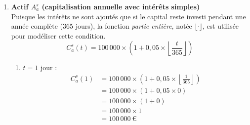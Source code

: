 \documentclass{article}
\begin{document}
\begin{enumerate}[label=\textbf{R1.\arabic*}]
\begin{enumerate}[label=(\alph*)]
              \item $t = 30\ \text{ans} = 10\,950\ \text{jours}$~: 
                    \begin{align*}
                        C_q^s(10\,950) & = 100\,000 \times \left(1 + \frac{0,05}{365} \times 10\,950\right) \\
                                       & = 100\,000 \times (1 + 1,5)                                        \\
                                       & = 100\,000 \times 2,5                                              \\
                                       & = \boxed{250\,000,00\ \text{€}}                                  
                    \end{align*}
                            
          \end{enumerate}
          
    \item \textbf{Actif \( A_a^s \) (capitalisation annuelle avec intérêts simples)} \\
          Puisque les intérêts ne sont ajoutés que si le capital reste investi pendant une année complète (365 jours), la fonction \emph{partie entière}, notée $\lfloor \cdot \rfloor$, est utilisée pour modéliser cette condition.
          \[
              C_a^s(t) = 100\,000 \times \left(1 + 0,05 \times \left\lfloor \frac{t}{365} \right\rfloor \right)
          \]
          \begin{enumerate}[label=(\alph*)]
              \item \( t = 1 \) jour : 
                    \begin{align*}
                        C_a^s(1) & = 100\,000 \times \left(1 + 0,05 \times \left\lfloor \frac{1}{365} \right\rfloor \right) \\
                                 & = 100\,000 \times \left(1 + 0,05 \times 0 \right)                                        \\
                                 & = 100\,000 \times (1 + 0)                                                                \\
                                 & = 100\,000 \times 1                                                                      \\
                                 & = \boxed{100\,000\ \text{€}}                                                           
                    \end{align*}
                            

\end{enumerate}
\end{enumerate}
\end{document}
